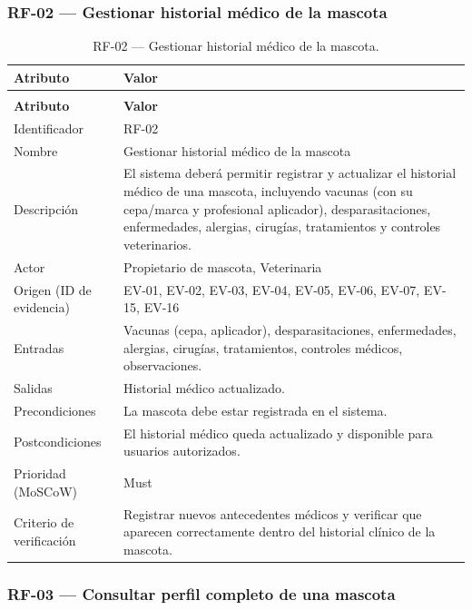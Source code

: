 \documentclass[journal,onecolumn]{IEEEtran}
\makeatletter
\newenvironment{atributos}[2]{%
	\small
	\begin{longtable}{@{}>{\raggedright\arraybackslash}p{4.2cm} >{\raggedright\arraybackslash}p{11.2cm}@{}}
		\caption{#2}\label{tab:#1}\\
		\toprule
		\textbf{Atributo} & \textbf{Valor} \\
		\midrule
		\endfirsthead
		\multicolumn{2}{@{}l}{\small\itshape (continuación)}\\
		\toprule
		\textbf{Atributo} & \textbf{Valor} \\
		\midrule
		\endhead
		\bottomrule
		\endlastfoot
	}{%
	\end{longtable}
	\normalsize
}
\makeatother
\begin{document}
	\subsubsection{RF-02 --- Gestionar historial médico de la mascota}
	
	\begin{atributos}{RF-02}{RF-02 --- Gestionar historial médico de la mascota.}
		Identificador & RF-02 \\
		Nombre & Gestionar historial médico de la mascota \\
		Descripción & El sistema deberá permitir registrar y actualizar el historial médico de una mascota, incluyendo vacunas (con su cepa/marca y profesional aplicador), desparasitaciones, enfermedades, alergias, cirugías, tratamientos y controles veterinarios. \\
		Actor & Propietario de mascota, Veterinaria \\
		Origen (ID de evidencia) & EV-01, EV-02, EV-03, EV-04, EV-05, EV-06, EV-07, EV-15, EV-16 \\
		Entradas & Vacunas (cepa, aplicador), desparasitaciones, enfermedades, alergias, cirugías, tratamientos, controles médicos, observaciones. \\
		Salidas & Historial médico actualizado. \\
		Precondiciones & La mascota debe estar registrada en el sistema. \\
		Postcondiciones & El historial médico queda actualizado y disponible para usuarios autorizados. \\
		Prioridad (MoSCoW) & Must \\
		Criterio de verificación & Registrar nuevos antecedentes médicos y verificar que aparecen correctamente dentro del historial clínico de la mascota. \\
	\end{atributos}
	
	\subsubsection{RF-03 --- Consultar perfil completo de una mascota}
	
\end{document}
